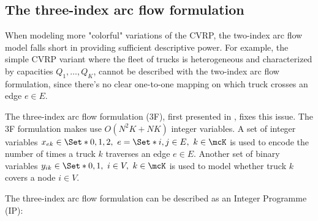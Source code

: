 \subsection{The three-index arc flow formulation}
\label{sec:intro-cvrp-three-index-flow-formulation}

When modeling more "colorful" variations of the CVRP,
the two-index arc flow model falls short in providing sufficient descriptive power.
For example,
the simple CVRP variant where the fleet of trucks is heterogeneous
and characterized by capacities $Q_1, \dots, Q_K$,
cannot be described with the two-index arc flow formulation,
since there's no clear one-to-one mapping on which truck crosses an edge $e \in E$.

The three-index arc flow formulation (3F),
first presented in \textcite{golden1977},
fixes this issue.
The 3F formulation makes use $O(N^2 K + N K)$ integer variables.
A set of integer variables $x_{ek} \in \Set*{0, 1, 2},\ e = \Set*{i, j} \in E,\ k \in \mcK$
is used to encode the number of times a truck $k$ traverses an edge $e \in E$.
Another set of binary variables $y_{ik} \in \Set*{0, 1},\ i \in V,\ k \in \mcK$
is used to model whether truck $k$ covers a node $i \in V$.


The three-index arc flow formulation can be described as an Integer Programme (IP):


